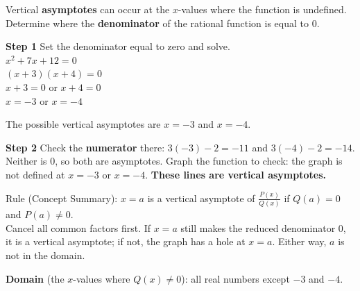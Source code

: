\begin{minipage}[t]{0.6\textwidth}
\vspace{0pt}\raggedright
Vertical \textbf{asymptotes} can occur at the $x$-values where the function is undefined. Determine where the \textbf{denominator} of the rational function is equal to 0.

\textbf{Step 1} Set the denominator equal to zero and solve.\\[2pt]
$x^2+7x+12=0$\\
$(x+3)(x+4)=0$\\
$x+3=0$ or $x+4=0$\\
$x=-3$ or $x=-4$

The possible vertical asymptotes are $x=-3$ and $x=-4$.

\textbf{Step 2} Check the \textbf{numerator} there: $3(-3)-2=-11$ and $3(-4)-2=-14$. Neither is 0, so both are asymptotes. Graph the function to check: the graph is not defined at $x=-3$ or $x=-4$. \textbf{These lines are vertical asymptotes.}

{\small Rule (Concept Summary): $x=a$ is a vertical asymptote of $\frac{P(x)}{Q(x)}$ if $Q(a)=0$ and $P(a)\neq0$.\\ Cancel all common factors first. If $x=a$ still makes the reduced denominator 0, it is a vertical asymptote; if not, the graph has a hole at $x=a$. Either way, $a$ is not in the domain.}

\textbf{Domain} (the $x$-values where $Q(x)\neq0$): all real numbers except $-3$ and $-4$.
\end{minipage}\hfill
\begin{minipage}[t]{0.38\textwidth}
\vspace{0pt}
\begin{center}
\end{center}
\end{minipage}

